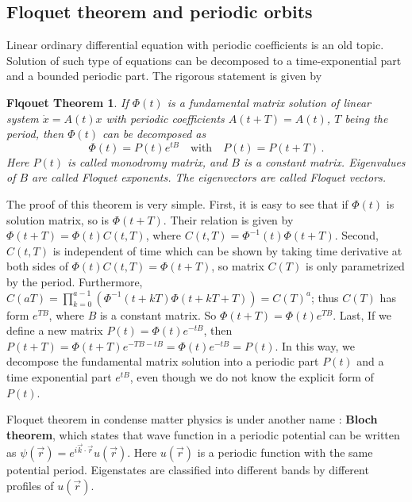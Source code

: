 \renewcommand{\inputfile}{\version\ - Predrag edited 2014-10-28 cLvsLit}


\newtheorem{floquet_theorem}{Flqouet Theorem}

\subsection{Floquet theorem and periodic orbits}

Linear ordinary differential equation with periodic
coefficients is an old topic. Solution of such type of
equations can be decomposed to a time-exponential part
and a bounded periodic part. The rigorous statement is given by
\begin{floquet_theorem}\cite{Floquet1883}
  \label{them:ft}
  If $\Phi(t)$ is a fundamental matrix solution of linear system
  $\dot{x} = A(t)x$ with periodic coefficients $A(t+T)=A(t)$,
  $T$ being the period, then $\Phi(t)$ can be decomposed as
  \[
    \Phi(t) = P(t)e^{tB} \quad \text{with} \quad P(t) = P(t+T)
    \,.
  \]
  Here $P(t)$ is called monodromy matrix, and $B$ is a constant
  matrix. Eigenvalues of $B$ are called Floquet exponents. The
  eigenvectors are called Floquet vectors.
\end{floquet_theorem}
The proof of this theorem is very simple. First, it is easy to
see that if $\Phi(t)$ is solution matrix, so is $\Phi(t+T)$.
Their relation is given by $\Phi(t+T)=\Phi(t)C(t, T)$, where
$C(t, T) = \Phi^{-1}(t)\Phi(t+T)$. Second, $C(t, T)$ is independent
of time which can be shown by taking time derivative
at both sides of $\Phi(t)C(t, T) = \Phi(t+T)$, so matrix $C(T)$
is only parametrized by the period. Furthermore,
$C(aT) = \prod_{k=0}^{a-1}\left(\Phi^{-1}(t+kT)\Phi(t+kT+T)\right) = C(T)^a$;
thus $C(T)$ has form $e^{TB}$, where $B$ is a constant matrix.
So $\Phi(t+T)=\Phi(t)e^{TB}$. Last,
If we define a new matrix $P(t) = \Phi(t)e^{-tB}$, then
$P(t+T) = \Phi(t+T)e^{-TB-tB} = \Phi(t)e^{-tB} = P(t)$. In this way,
we decompose the fundamental matrix solution into a periodic part
$P(t)$
and a time exponential part $e^{tB}$,
even though we do not know the explicit
form of $P(t)$.

Floquet theorem in condense matter physics is under another name
: \textbf{Bloch theorem}, which states that wave function in a periodic
potential can be written as
$\psi(\vec{r}) = e^{i\vec{k}\cdot\vec{r}}u(\vec{r})$.
Here $u(\vec{r})$ is a periodic function with the same potential period.
Eigenstates are classified into different bands by different profiles of
$u(\vec{r})$.

